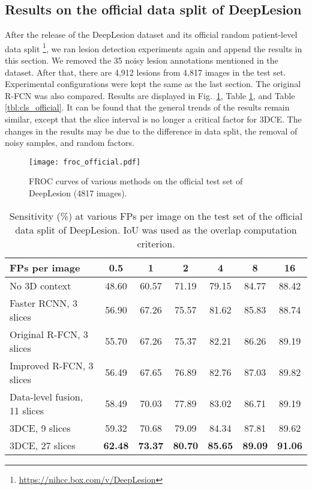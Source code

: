 \documentclass[a4paper]{llncs}
\def\Fig#1{{Fig.\ \ref{fig:#1}}}
\def\Tbl#1{{Table \ref{tbl:#1}}}
\begin{document}
\subsection{Results on the official data split of DeepLesion}
\label{subsec:official_res}

After the release of the DeepLesion dataset and its official random patient-level data split \footnote{\url{https://nihcc.box.com/v/DeepLesion}}, we ran lesion detection experiments again and append the results in this section. We removed the 35 noisy lesion annotations mentioned in the dataset. After that, there are 4,912 lesions from 4,817 images in the test set. Experimental configurations were kept the same as the last section. The original R-FCN was also compared. Results are displayed in \Fig{froc_official}, \Tbl{acc_official}, and \Tbl{cls_official}. It can be found that the general trends of the results remain similar, except that the slice interval is no longer a critical factor for 3DCE. The changes in the results may be due to the difference in data split, the removal of noisy samples, and random factors.

\begin{figure}[]
\begin{center}
\texttt{[image: froc\_official.pdf]} \end{center}
	\caption{FROC curves of various methods on the official test set of DeepLesion (4817 images).}
	\label{fig:froc_official}
\end{figure}

\begin{table}[]
	\centering
\setlength{\tabcolsep}{5pt}
	\renewcommand{\arraystretch}{1.2}
	\caption{Sensitivity (\%) at various FPs per image on the test set of the official data split of DeepLesion. IoU was used as the overlap computation criterion.}
	\begin{tabular}{p{4cm}cccccc}
		\hline
		FPs per image	& 0.5	& 1		& 2		& 4		& 8		& 16 \\
		\hline
		No 3D context	& 48.60	& 60.57	& 71.19	& 79.15	& 84.77	& 88.42	\\
		Faster RCNN, 3 slices	& 56.90	& 67.26	& 75.57	& 81.62	& 85.83	& 88.74	\\
		Original R-FCN, 3 slices	& 55.70	& 67.26	& 75.37	& 82.21	& 86.26	& 89.19	\\
		Improved R-FCN, 3 slices	& 56.49	& 67.65	& 76.89	& 82.76	& 87.03	& 89.82	\\
		Data-level fusion, 11 slices	& 58.49	& 70.03	& 77.89	& 83.02	& 86.71	& 89.19	\\
		3DCE, 9 slices	& 59.32	& 70.68	& 79.09	& 84.34	& 87.81	& 89.62	\\
3DCE, 27 slices	& \bf 62.48	& \bf 73.37	& \bf 80.70	& \bf 85.65	& \bf 89.09	& \bf 91.06	\\
		\hline
	\end{tabular}

\label{tbl:acc_official}
\end{table}
\end{document}
